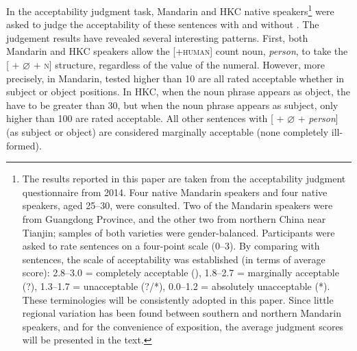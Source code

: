 \documentclass[output=paper]{langsci/langscibook}
\begin{document}
In the acceptability judgment task, Mandarin and \gls{HKC} native
speakers\footnote{The results reported in this paper are taken from the
    acceptability judgment questionnaire from 2014. Four native
    Mandarin speakers and four native 
    speakers, aged 25--30,
    were consulted. Two of the Mandarin speakers were from Guangdong
    Province, and the other two from northern China near Tianjin; samples of
    both varieties were gender-balanced. Participants were asked to rate
    sentences on a four-point scale (0--3). By comparing with  sentences,
    the scale of acceptability was established (in terms of average score):
    2.8--3.0 = completely acceptable (), 1.8--2.7 = marginally acceptable (?),
    1.3--1.7 = unacceptable (?/*), 0.0--1.2 = absolutely unacceptable (*). These
    terminologies will be consistently adopted in this paper. Since little
    regional variation has been found between southern and northern Mandarin
speakers, and for the convenience of exposition, the average judgment scores
will be presented in the text.} were asked to judge the acceptability of these
sentences with and without . The judgement results have revealed
several interesting patterns.  First, both Mandarin and \gls{HKC} speakers
allow the [+\textsc{human}] count noun, \emph{person}, to take the [\Num{} +
$\varnothing$ + \textsc{n}] structure, regardless of the value of the numeral. However,
more precisely, in Mandarin, tested  higher than 10 are all rated
acceptable whether in subject or object positions.  In \gls{HKC}, when the noun
phrase appears as object, the  have to be greater than 30, but when the
noun phrase appears as subject, only  higher than 100 are rated
acceptable. All other sentences with [\Num{} + ${\varnothing}$ + \emph{person}]
(as subject or object) are considered marginally acceptable (none completely
ill-formed).
\end{document}
